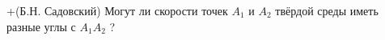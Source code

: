 +(Б.Н. Садовский)
Могут ли скорости точек $A_{1}$ и $A_{2}$ твёрдой среды иметь разные углы с
$A_{1}A_{2}$ ?
